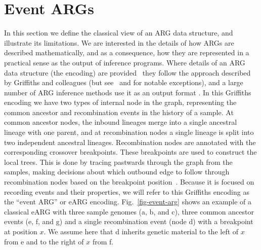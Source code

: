 \documentclass{article}
\newcommand{\noderef}[1]{\textsf{#1}}
\begin{document}
\section{Event ARGs}
\label{sec-eARG}
In this section we define the classical view of an ARG data structure,
and illustrate its limitations. We are
interested in the details of how ARGs are described mathematically,
and as a consequence, how they are represented in a practical sense
as the output of inference programs.
Where details of an ARG data structure (the encoding) are
provided~\citep[e.g.][]{
wiuf1999recombination,gusfield2014recombinatorics,hayman2023recoverability}
they follow the approach described by Griffiths and colleagues
(but see~\citet{parida2011minimal} and \citet{zhang2023biobank}
for notable exceptions), and a large number of
ARG inference methods use it as an output format
\citep[e.g.][]{song2004minimum,song2005efficient,rasmussen2014genome,
heine2018bridging,ignatieva2021kwarg}.
In this Griffiths encoding we have two types of internal node in the graph,
representing the common ancestor and recombination events
in the history of a sample.
At common ancestor nodes, the inbound lineages merge into a
single ancestral lineage with one parent, and at recombination
nodes a single lineage is split into two independent
ancestral lineages. Recombination nodes are annotated with
the corresponding crossover breakpoints. These breakpoints
are used to construct the local trees.
This is done by tracing pastwards through the graph from the samples,
making decisions about which outbound edge to follow through
recombination nodes based on the breakpoint
position~\citep{griffiths1996ancestral}.
Because it is focused on recording events and their properties,
we will refer to this Griffiths encoding as the ``event ARG'' or eARG
encoding. Fig.~\ref{fig-event-arg} shows an example of a classical
eARG with three sample genomes (\noderef{a}, \noderef{b}, and \noderef{c}),
three common ancestor events (\noderef{e}, \noderef{f}, and \noderef{g})
and a single recombination event (node \noderef{d}) with a breakpoint
at position $x$.
We assume here that \noderef{d} inherits genetic material to the
left of $x$ from \noderef{e} and to the right of $x$ from \noderef{f}.
\end{document}
